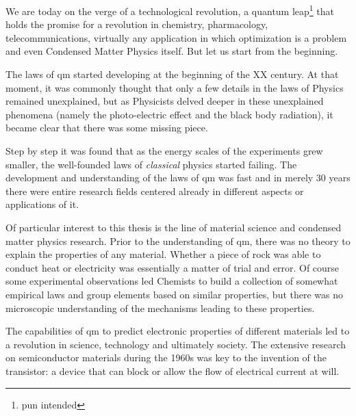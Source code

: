 \newpage

We are today on the verge of a technological revolution, a quantum leap\footnote{pun intended} that holds the promise for a revolution in chemistry, pharmacology, telecommunications, virtually any application in which optimization is a problem and even Condensed Matter Physics itself.
But let us start from the beginning.
\medbreak

The laws of \ac{qm} started developing at the beginning of the XX century. At that moment, it was commonly thought that only a few details in the laws of Physics remained unexplained, but as Physicists delved deeper in these unexplained phenomena (namely the photo-electric effect and the black body radiation), it became clear that there was some missing piece.

Step by step it was found that as the energy scales of the experiments grew smaller, the well-founded laws of \emph{classical} physics started failing.
The development and understanding of the laws of \ac{qm} was fast and in merely 30 years there were entire research fields centered already in different aspects or applications of it.

Of particular interest to this thesis is the line of material science and condensed matter physics research. Prior to the understanding of \ac{qm}, there was no theory to explain the properties of any material.
Whether a piece of rock was able to conduct heat or electricity was essentially a matter of trial and error. Of course some experimental observations led Chemists to build a collection of somewhat empirical laws and group elements based on similar properties, but there was no microscopic understanding of the mechanisms leading to these properties.

The capabilities of \ac{qm} to predict electronic properties of different materials led to a revolution in science, technology and ultimately society. The extensive research on semiconductor materials during the 1960s was key to the invention of the transistor: a device that can block or allow the flow of electrical current at will.

